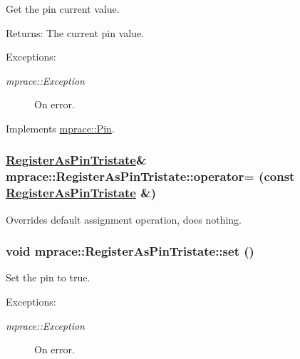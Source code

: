 Get the pin current value. 

\begin{Desc}
\item[Returns:]The current pin value. \end{Desc}
\begin{Desc}
\item[Exceptions:]
\begin{description}
\item[{\em mprace::Exception}]On error.\end{description}
\end{Desc}


Implements \hyperlink{classmprace_1_1Pin_a2}{mprace::Pin}.\hypertarget{classmprace_1_1RegisterAsPinTristate_b1}{
\subsubsection[operator=]{\setlength{\rightskip}{0pt plus 5cm}\hyperlink{classmprace_1_1RegisterAsPinTristate}{Register\-As\-Pin\-Tristate}\& mprace::Register\-As\-Pin\-Tristate::operator= (const \hyperlink{classmprace_1_1RegisterAsPinTristate}{Register\-As\-Pin\-Tristate} \&)}}
\label{classmprace_1_1RegisterAsPinTristate_b1}


Overrides default assignment operation, does nothing. 

\hypertarget{classmprace_1_1RegisterAsPinTristate_a5}{
\subsubsection[set]{\setlength{\rightskip}{0pt plus 5cm}void mprace::Register\-As\-Pin\-Tristate::set ()}}
\label{classmprace_1_1RegisterAsPinTristate_a5}


Set the pin to true. 

\begin{Desc}
\item[Exceptions:]
\begin{description}
\item[{\em mprace::Exception}]On error.\end{description}
\end{Desc}


